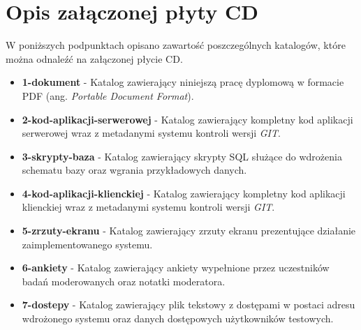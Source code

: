 \chapter{Opis załączonej płyty CD}

W poniższych podpunktach opisano zawartość poszczególnych katalogów, które można odnaleźć na załączonej płycie CD.\\

\begin{itemize}

\item \textbf{1-dokument} - Katalog zawierający niniejszą pracę dyplomową w formacie PDF (ang. \textit{Portable Document Format}).  \\

\item \textbf{2-kod-aplikacji-serwerowej} - Katalog zawierający kompletny kod aplikacji serwerowej wraz z metadanymi systemu kontroli wersji \textit{GIT}.   \\


\item \textbf{3-skrypty-baza} - Katalog zawierający skrypty SQL służące do wdrożenia schematu bazy oraz wgrania przykładowych danych.   \\

\item \textbf{4-kod-aplikacji-klienckiej} - Katalog zawierający kompletny kod aplikacji klienckiej wraz z metadanymi systemu kontroli wersji \textit{GIT}.   \\

\item \textbf{5-zrzuty-ekranu} - Katalog zawierający zrzuty ekranu prezentujące działanie zaimplementowanego systemu.   \\

\item \textbf{6-ankiety} - Katalog zawierający ankiety wypełnione przez uczestników badań moderowanych oraz notatki moderatora.   \\


\item \textbf{7-dostepy} - Katalog zawierający plik tekstowy z dostępami w postaci adresu wdrożonego systemu oraz danych dostępowych użytkowników testowych.

\end{itemize}



